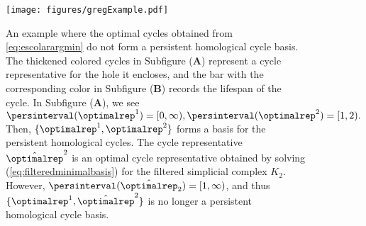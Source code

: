 \begin{figure}[h!]
\begin{center}
\texttt{[image: figures/gregExample.pdf]}%
\end{center}
\caption{An example where the optimal cycles obtained from \pr \eqref{eq:escolarargmin} do not form a persistent homological cycle basis. The thickened colored cycles in Subfigure (\textbf{A}) represent a cycle representative for the hole it encloses, and the bar with the corresponding color in Subfigure (\textbf{B}) records the lifespan of the cycle. In Subfigure (\textbf{A}), we see $\persinterval(\optimalrep^1) = [0,\infty), \persinterval(\optimalrep^2) = [1,2).$ Then, $\{\optimalrep^1, \optimalrep^2\}$ forms a basis for the persistent homological cycles. The cycle representative $\hat \optimalrep^2$ is an optimal cycle representative obtained by solving \pr (\ref{eq:filteredminimalbasis}) for the filtered simplicial complex $K_2$. However, $\persinterval(\hat \optimalrep_2) = [1, \infty)$, and thus  $\{\optimalrep^1, \hat \optimalrep^2\}$ is no longer a persistent homological cycle basis.} \label{fig:example-persBasis}
\end{figure}
